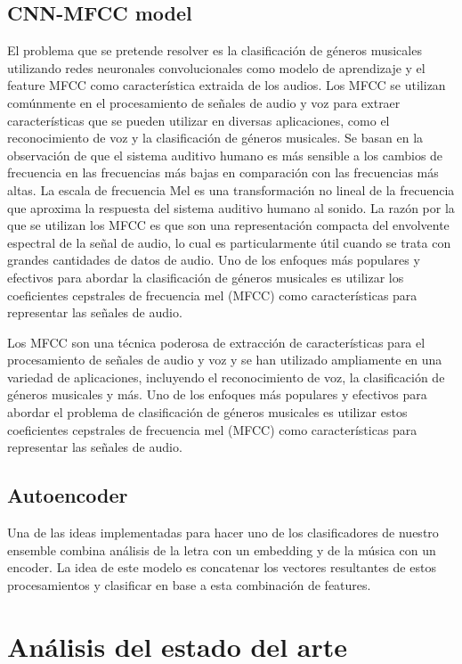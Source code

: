 \documentclass[colorinlistoftodos,twoside,twocolumn,10pt]{article} %
\begin{document}
\subsection {CNN-MFCC model}
El problema que se pretende resolver es la clasificaci\'on de g\'eneros musicales utilizando redes neuronales convolucionales como modelo de aprendizaje y el feature MFCC como caracter\'istica extraida de los audios.
Los MFCC se utilizan com\'unmente en el procesamiento de se\~nales de audio y voz para extraer caracter\'isticas que se pueden utilizar en diversas aplicaciones, como el reconocimiento de voz y la clasificaci\'on de g\'eneros musicales. Se basan en la observaci\'on de que el sistema auditivo humano es m\'as sensible a los cambios de frecuencia en las frecuencias m\'as bajas en comparaci\'on con las frecuencias m\'as altas. La escala de frecuencia Mel es una transformaci\'on no lineal de la frecuencia que aproxima la respuesta del sistema auditivo humano al sonido. La raz\'on por la que se utilizan los MFCC es que son una representaci\'on compacta del envolvente espectral de la se\~nal de audio, lo cual es particularmente \'util cuando se trata con grandes cantidades de datos de audio.
Uno de los enfoques m\'as populares y efectivos para abordar la clasificaci\'on de g\'eneros musicales es utilizar los coeficientes cepstrales de frecuencia mel (MFCC) como caracter\'isticas para representar las se\~nales de audio.

Los MFCC son una t\'ecnica poderosa de extracci\'on de caracter\'isticas para el procesamiento de se\~nales de audio y voz y se han utilizado ampliamente en una variedad de aplicaciones, incluyendo el reconocimiento de voz, la clasificaci\'on de g\'eneros musicales y m\'as.
Uno de los enfoques m\'as populares y efectivos para abordar el problema de clasificaci\'on de g\'eneros musicales es utilizar estos coeficientes cepstrales de frecuencia mel (MFCC) como caracter\'isticas para representar las se\~nales de audio.

\subsection {Autoencoder}
Una de las ideas implementadas para hacer uno de los clasificadores de nuestro ensemble combina an\'alisis de la letra con un embedding y de la m\'usica con un encoder. La idea de este modelo es concatenar los vectores resultantes de estos procesamientos y clasificar en base a esta combinaci\'on de features.

\section {An\'alisis del estado del arte}
\end{document}
